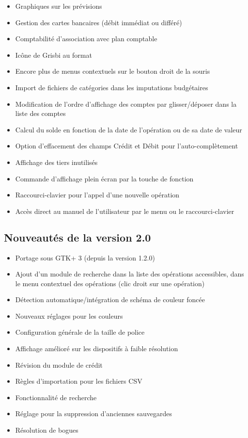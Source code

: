 \begin{itemize}
	\item Graphiques sur les prévisions
	\item Gestion des cartes bancaires (débit immédiat ou différé)
	\item Comptabilité d'association avec plan comptable
	\item Icône de Grisbi au format 
	\item Encore plus de menus contextuels sur le bouton droit de la souris
	\item Import de fichiers de catégories dans les imputations budgétaires
	\item Modification de l'ordre d'affichage des comptes par glisser/déposer dans la liste des comptes
	\item Calcul du solde en fonction de la date de l'opération ou de sa date de valeur
	\item Option d'effacement des champs Crédit et Débit pour l'auto-complètement
	\item Affichage des tiers inutilisés	
	\item Commande d'affichage plein écran par la touche de fonction 
	\item Raccourci-clavier  pour l'appel d'une nouvelle opération
	\item Accès direct au manuel de l'utilisateur par le menu  ou le raccourci-clavier 
\end{itemize}


\subsection{Nouveautés de la version 2.0}

\begin{itemize}
	\item Portage sous \gls{GTK}+ 3 (depuis la version 1.2.0)
	\item Ajout d'un module de recherche dans la liste des opérations accessibles, dans le menu contextuel des opérations (clic droit sur une opération)
	\item Détection automatique/intégration de schéma de couleur foncée
	\item Nouveaux réglages pour les couleurs
	\item Configuration générale de la taille de police
	\item Affichage amélioré sur les dispositifs à faible résolution
	\item Révision du module de crédit
	\item Règles d'importation pour les fichiers \gls{CSV}
	\item Fonctionnalité de recherche
	\item Réglage pour la suppression d'anciennes sauvegardes
	\item Résolution de bogues
\end{itemize}


